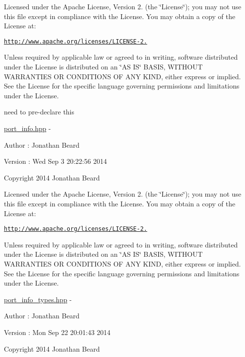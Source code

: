 Licensed under the Apache License, Version 2. (the \char`\"{}\+License\char`\"{}); you may not use this file except in compliance with the License. You may obtain a copy of the License at\+:

\href{http://www.apache.org/licenses/LICENSE-2.0}{\tt http\+://www.\+apache.\+org/licenses/\+L\+I\+C\+E\+N\+S\+E-\/2.}

Unless required by applicable law or agreed to in writing, software distributed under the License is distributed on an \char`\"{}\+A\+S I\+S\char`\"{} B\+A\+S\+I\+S, W\+I\+T\+H\+O\+U\+T W\+A\+R\+R\+A\+N\+T\+I\+E\+S O\+R C\+O\+N\+D\+I\+T\+I\+O\+N\+S O\+F A\+N\+Y K\+I\+N\+D, either express or implied. See the License for the specific language governing permissions and limitations under the License.

need to pre-\/declare this

\hyperlink{port__info_8hpp_source}{port\+\_\+info.\+hpp} -\/ \begin{DoxyAuthor}{Author}
\+: Jonathan Beard 
\end{DoxyAuthor}
\begin{DoxyVersion}{Version}
\+: Wed Sep 3 20\+:22\+:56 2014
\end{DoxyVersion}
Copyright 2014 Jonathan Beard

Licensed under the Apache License, Version 2. (the \char`\"{}\+License\char`\"{}); you may not use this file except in compliance with the License. You may obtain a copy of the License at\+:

\href{http://www.apache.org/licenses/LICENSE-2.0}{\tt http\+://www.\+apache.\+org/licenses/\+L\+I\+C\+E\+N\+S\+E-\/2.}

Unless required by applicable law or agreed to in writing, software distributed under the License is distributed on an \char`\"{}\+A\+S I\+S\char`\"{} B\+A\+S\+I\+S, W\+I\+T\+H\+O\+U\+T W\+A\+R\+R\+A\+N\+T\+I\+E\+S O\+R C\+O\+N\+D\+I\+T\+I\+O\+N\+S O\+F A\+N\+Y K\+I\+N\+D, either express or implied. See the License for the specific language governing permissions and limitations under the License.

\hyperlink{port__info__types_8hpp_source}{port\+\_\+info\+\_\+types.\+hpp} -\/ \begin{DoxyAuthor}{Author}
\+: Jonathan Beard 
\end{DoxyAuthor}
\begin{DoxyVersion}{Version}
\+: Mon Sep 22 20\+:01\+:43 2014
\end{DoxyVersion}
Copyright 2014 Jonathan Beard

